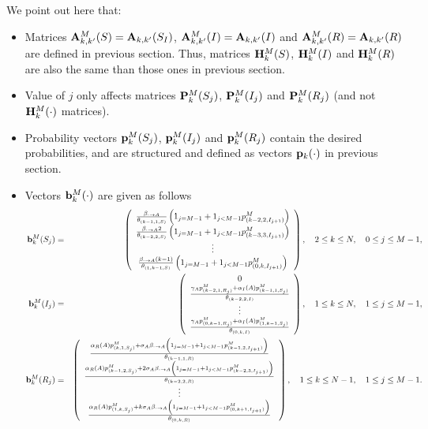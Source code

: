 \documentclass[10pt,A4paper]{article}
\begin{document}
\par We point out here that:
\begin{itemize}
 \item Matrices ${\bf A}^M_{k,k'}(S)={\bf A}_{k,k'}(S_I)$, ${\bf A}^M_{k,k'}(I)={\bf A}_{k,k'}(I)$ and ${\bf A}^M_{k,k'}(R)={\bf A}_{k,k'}(R)$ are
defined in previous section. Thus, matrices ${\bf H}^M_k(S)$, ${\bf H}^M_k(I)$ and ${\bf H}^M_k(R)$ are also the same than those ones
in previous section.
  \item Value of $j$ only affects matrices ${\bf P}^M_k(S_j)$, ${\bf P}^M_k(I_j)$ and ${\bf P}^M_k(R_j)$ (and not ${\bf H}^M_k(\cdot)$ matrices).
  \item Probability vectors ${\bf p}^M_k(S_j)$, ${\bf p}^M_k(I_j)$ and ${\bf p}^M_k(R_j)$ contain the desired probabilities, and are
structured and defined as vectors ${\bf p}_k(\cdot)$ in previous section.
  \item Vectors ${\bf b}^M_k(\cdot)$ are given as follows
\begin{eqnarray*}
 {\bf b}^M_k(S_j) & = & \left(\begin{array}{c}
               \frac{\beta_{\cdot\rightarrow A}}{\theta_{(k-1,1,S)}}\left(1_{j=M-1}+1_{j<M-1}p^M_{(k-2,2,I_{j+1})}\right)\\
\frac{\beta_{\cdot\rightarrow A}2}{\theta_{(k-2,2,S)}}\left(1_{j=M-1}+1_{j<M-1}p^M_{(k-3,3,I_{j+1})}\right)\\
\vdots\\
\frac{\beta_{\cdot\rightarrow A}(k-1)}{\theta_{(1,k-1,S)}}\left(1_{j=M-1}+1_{j<M-1}p^M_{(0,k,I_{j+1})}\right)\\
                         \end{array}\right),\quad 2\leq k\leq N,\quad 0\leq j\leq M-1,\\
{\bf b}^M_k(I_j) & = & \left(\begin{array}{c}
               0\\
\frac{\gamma_Ap^M_{(k-2,1,R_j)}+\alpha_I(A)p^M_{(k-1,1,S_j)}}{\theta_{(k-2,2,I)}}\\
\vdots\\
\frac{\gamma_Ap^M_{(0,k-1,R_j)}+\alpha_I(A)p^M_{(1,k-1,S_j)}}{\theta_{(0,k,I)}}
                         \end{array}\right),\quad 1\leq k\leq N,\quad 1\leq j\leq M-1,\\
{\bf b}^M_k(R_j) & = & \left(\begin{array}{c}
\frac{\alpha_R(A)p^M_{(k,1,S_j)}+\sigma_A\beta_{\cdot\rightarrow A}\left(1_{j=M-1}+1_{j<M-1}p^M_{(k-1,2,I_{j+1})}\right)}{\theta_{(k-1,1,R)}}\\
\frac{\alpha_R(A)p^M_{(k-1,2,S_j)}+2\sigma_A\beta_{\cdot\rightarrow A}\left(1_{j=M-1}+1_{j<M-1}p^M_{(k-2,3,I_{j+1})}\right)}{\theta_{(k-2,2,R)}}\\
\vdots\\
\frac{\alpha_R(A)p^M_{(1,k,S_j)}+k\sigma_A\beta_{\cdot\rightarrow A}\left(1_{j=M-1}+1_{j<M-1}p^M_{(0,k+1,I_{j+1})}\right)}{\theta_{(0,k,R)}}
                         \end{array}\right),\quad 1\leq k\leq N-1,\quad 1\leq j\leq M-1.
\end{eqnarray*}

\end{itemize}
\end{document}
